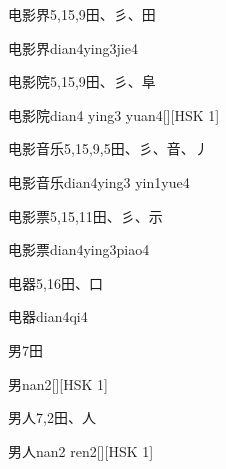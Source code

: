 \begin{entry}{电影界}{5,15,9}{⽥、⼺、⽥}
  \begin{phonetics}{电影界}{dian4ying3jie4}
  \end{phonetics}
\end{entry}

\begin{entry}{电影院}{5,15,9}{⽥、⼺、⾩}
  \begin{phonetics}{电影院}{dian4 ying3 yuan4}[][HSK 1]
  \end{phonetics}
\end{entry}

\begin{entry}{电影音乐}{5,15,9,5}{⽥、⼺、⾳、⼃}
  \begin{phonetics}{电影音乐}{dian4ying3 yin1yue4}
  \end{phonetics}
\end{entry}

\begin{entry}{电影票}{5,15,11}{⽥、⼺、⽰}
  \begin{phonetics}{电影票}{dian4ying3piao4}
  \end{phonetics}
\end{entry}

\begin{entry}{电器}{5,16}{⽥、⼝}
  \begin{phonetics}{电器}{dian4qi4}
  \end{phonetics}
\end{entry}

\begin{entry}{男}{7}{⽥}
  \begin{phonetics}{男}{nan2}[][HSK 1]
  \end{phonetics}
\end{entry}

\begin{entry}{男人}{7,2}{⽥、⼈}
  \begin{phonetics}{男人}{nan2 ren2}[][HSK 1]
  \end{phonetics}
\end{entry}

